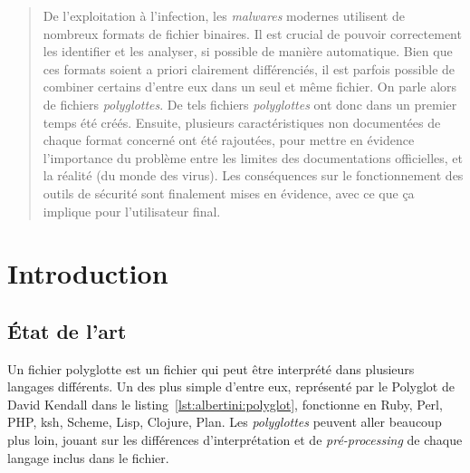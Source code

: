 ﻿

\newcommand{\TODO}[1]{}

\newcommand{\WIN}[0]{\emph{Windows}\xspace}

\newcommand{\ZIP}[0]{\emph{ZIP}\xspace}
\newcommand{\JAVA}[0]{\emph{Java}\xspace}
\newcommand{\GIF}[0]{\emph{GIF}\xspace}
\newcommand{\PE}[0]{\emph{PE}\xspace}
\newcommand{\ELF}[0]{\emph{ELF}\xspace}
\newcommand{\MACHO}[0]{\emph{Mach-O}\xspace}
\newcommand{\JAR}[0]{\emph{JAR}\xspace}
\newcommand{\HTML}[0]{\emph{HTML}\xspace}
\newcommand{\PDF}[0]{\emph{PDF}\xspace}



\maketitle

\begin{abstract}
De l'exploitation à l'infection, les {\it malwares} modernes utilisent de nombreux formats de fichier binaires.
Il est crucial de pouvoir correctement les identifier et les analyser, si possible de manière automatique.
Bien que ces formats soient a priori clairement différenciés, il est parfois possible de combiner certains d'entre eux dans un seul et même fichier.
On parle alors de fichiers {\it polyglottes}.
De tels fichiers {\it polyglottes} ont donc dans un premier temps été créés.
Ensuite, plusieurs caractéristiques non documentées de chaque format concerné ont été rajoutées, pour mettre en évidence l'importance du problème entre les limites des documentations officielles, et la réalité (du monde des virus).
Les conséquences sur le fonctionnement des outils de sécurité sont finalement mises en évidence, avec ce que ça implique pour l'utilisateur final.
\end{abstract}


\section{Introduction}

\subsection{État de l'art}

Un fichier polyglotte est un fichier qui peut être interprété dans plusieurs langages différents.  Un des plus simple d'entre eux, représenté par le Polyglot de David Kendall dans le listing~\ref{lst:albertini:polyglot}, fonctionne en Ruby, Perl, PHP, ksh, Scheme, Lisp, Clojure, Plan. Les {\it polyglottes} peuvent aller beaucoup plus loin, jouant sur les différences d'interprétation et de {\it pré-processing} de chaque langage inclus dans le fichier.


